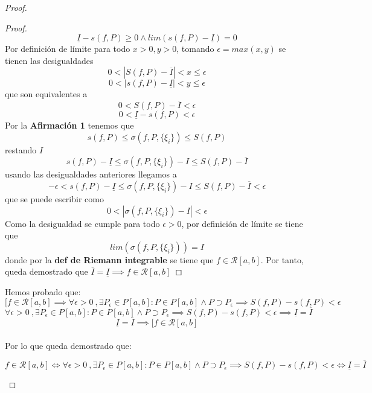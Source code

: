 \documentclass{article}
\begin{document}
\begin{proof}
\begin{enumerate}
\begin{proof}
\[
\underline{I} - s(f, P) \geq 0 \wedge lim (s(f, P) - \underline{I}) = 0
\]
Por definición de límite para todo \(x > 0, y > 0\), tomando \(\epsilon = max(x, y)\) se tienen las desigualdades 
\[
0< |S(f, P) - \overline{I} | < x \leq \epsilon
\]
\[
0< |s(f, P) - \underline{I} | < y \leq \epsilon 
\]
que son equivalentes a
\[
0< S(f, P) - \overline{I}  < \epsilon
\]
\[
0<  \underline{I} -  s(f, P)  < \epsilon
\]
Por la \textbf{Afirmación 1} tenemos que 
\[
s(f, P) \leq \sigma(f, P,\{\xi_i\}) \leq S(f, P)
\]
restando \(I\)
\[
s(f, P) -\underline{I} \leq \sigma(f, P,\{\xi_i\}) - I \leq S(f, P) - \overline{I}
\]
usando las desigualdades anteriores llegamos a 
\[
-\epsilon < s(f, P) -\underline{I} \leq \sigma(f, P,\{\xi_i\}) - I \leq S(f, P) - \overline{I} < \epsilon
\]
que se puede escribir como
\[
0 <|\sigma(f, P,\{\xi_i\}) - I |< \epsilon
\]
Como la desigualdad se cumple para todo \(\epsilon > 0\), por definición de límite se tiene que 
\[
lim(\sigma(f, P,\{\xi_i\})) = I
\]
donde por la \textbf{def de Riemann integrable} se tiene que \(f \in \mathcal{R}[a, b]\). Por tanto, queda demostrado que \( \overline{I} = \underline{I} \implies f \in \mathcal{R}[a, b] \)
\end{proof}
Hemos probado que:
\[[f \in \mathcal{R}[a, b] \implies \forall \epsilon>0\ ,  \exists P_\epsilon \in P[a, b]: P \in P[a, b] \wedge P \supset P_\epsilon \implies S(f, P) - s(f, P) < \epsilon\]
\[\forall \epsilon>0\ ,  \exists P_\epsilon \in P[a, b]: P \in P[a, b] \wedge P \supset P_\epsilon \implies S(f, P) - s(f, P) < \epsilon \implies \underline{I} = \overline{I}\]
\[\underline{I} = \overline{I} \implies [f \in \mathcal{R}[a, b]\]\\
Por lo que queda demostrado que:

\[f \in \mathcal{R}[a, b] \Longleftrightarrow \forall \epsilon>0\ ,  \exists P_\epsilon \in P[a, b]: P \in P[a, b] \wedge P \supset P_\epsilon \implies S(f, P) - s(f, P) < \epsilon \Longleftrightarrow \underline{I} = \overline{I}\]






\end{enumerate}

\end{proof}
\end{document}
